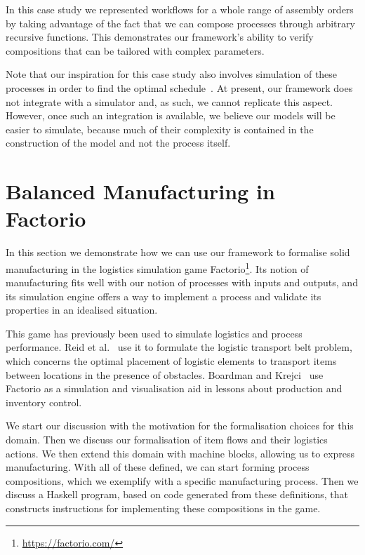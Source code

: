 \documentclass[class=smolathesis,crop=false]{standalone}
\begin{document}
In this case study we represented workflows for a whole range of assembly orders by taking advantage of the fact that we can compose processes through arbitrary recursive functions.
This demonstrates our framework's ability to verify compositions that can be tailored with complex parameters.

Note that our inspiration for this case study also involves simulation of these processes in order to find the optimal schedule~\cite{papapa_et_al-2021}.
At present, our framework does not integrate with a simulator and, as such, we cannot replicate this aspect.
However, once such an integration is available, we believe our models will be easier to simulate, because much of their complexity is contained in the construction of the model and not the process itself.

\section{Balanced Manufacturing in Factorio}
\label{sec:cases/factorio}

In this section we demonstrate how we can use our framework to formalise solid manufacturing in the logistics simulation game Factorio\footnote{\url{https://factorio.com/}}.
Its notion of manufacturing fits well with our notion of processes with inputs and outputs, and its simulation engine offers a way to implement a process and validate its properties in an idealised situation.

This game has previously been used to simulate logistics and process performance.
Reid et al.~\cite{reid_et_al-2021} use it to formulate the logistic transport belt problem, which concerns the optimal placement of logistic elements to transport items between locations in the presence of obstacles.
Boardman and Krejci~\cite{boardman_krejci-2021} use Factorio as a simulation and visualisation aid in lessons about production and inventory control.

We start our discussion with the motivation for the formalisation choices for this domain.
Then we discuss our formalisation of item flows and their logistics actions.
We then extend this domain with machine blocks, allowing us to express manufacturing.
With all of these defined, we can start forming process compositions, which we exemplify with a specific manufacturing process.
Then we discuss a Haskell program, based on code generated from these definitions, that constructs instructions for implementing these compositions in the game.
\end{document}
